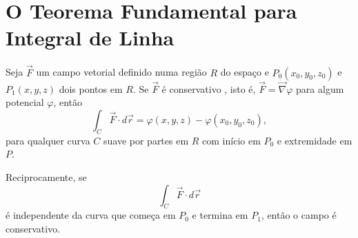 \section{O Teorema Fundamental para Integral de Linha}
\begin{teo}Seja $\vec{F}$ um campo vetorial definido numa região $R$ do espaço e $P_0(x_0,y_0,z_0)$ e $P_1(x,y,z)$ dois pontos em $R$. Se $\vec{F}$ é conservativo , isto é, $\vec{F}=\vec{\nabla}\varphi$ para algum potencial $\varphi$, então
\begin{equation}\label{TeoFundCalculo}
\int_C\vec{F}\cdot d \vec{r} =\varphi(x,y,z)-\varphi(x_0,y_0,z_0),
\end{equation}
para qualquer curva $C$ suave por partes em $R$ com início em $P_0$ e extremidade em $P$.

Reciprocamente, se
$$
\int_C\vec{F}\cdot d \vec{r}
$$
é independente da curva que começa em $P_0$ e termina em $P_1$, então o campo é conservativo.
\end{teo}
